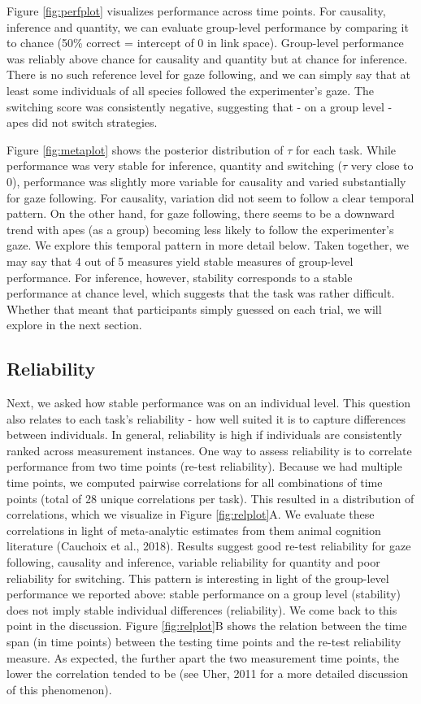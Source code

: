 \documentclass[10pt, letterpaper]{article}
\begin{document}
Figure \ref{fig:perfplot} visualizes performance across time points. For
causality, inference and quantity, we can evaluate group-level
performance by comparing it to chance (50\% correct = intercept of 0 in
link space). Group-level performance was reliably above chance for
causality and quantity but at chance for inference. There is no such
reference level for gaze following, and we can simply say that at least
some individuals of all species followed the experimenter's gaze. The
switching score was consistently negative, suggesting that - on a group
level - apes did not switch strategies.

Figure \ref{fig:metaplot} shows the posterior distribution of \(\tau\)
for each task. While performance was very stable for inference, quantity
and switching (\(\tau\) very close to 0), performance was slightly more
variable for causality and varied substantially for gaze following. For
causality, variation did not seem to follow a clear temporal pattern. On
the other hand, for gaze following, there seems to be a downward trend
with apes (as a group) becoming less likely to follow the experimenter's
gaze. We explore this temporal pattern in more detail below. Taken
together, we may say that 4 out of 5 measures yield stable measures of
group-level performance. For inference, however, stability corresponds
to a stable performance at chance level, which suggests that the task
was rather difficult. Whether that meant that participants simply
guessed on each trial, we will explore in the next section.

\hypertarget{reliability}{%
\subsection{Reliability}\label{reliability}}

Next, we asked how stable performance was on an individual level. This
question also relates to each task's reliability - how well suited it is
to capture differences between individuals. In general, reliability is
high if individuals are consistently ranked across measurement
instances. One way to assess reliability is to correlate performance
from two time points (re-test reliability). Because we had multiple time
points, we computed pairwise correlations for all combinations of time
points (total of 28 unique correlations per task). This resulted in a
distribution of correlations, which we visualize in Figure
\ref{fig:relplot}A. We evaluate these correlations in light of
meta-analytic estimates from them animal cognition literature (Cauchoix
et al., 2018). Results suggest good re-test reliability for gaze
following, causality and inference, variable reliability for quantity
and poor reliability for switching. This pattern is interesting in light
of the group-level performance we reported above: stable performance on
a group level (stability) does not imply stable individual differences
(reliability). We come back to this point in the discussion. Figure
\ref{fig:relplot}B shows the relation between the time span (in time
points) between the testing time points and the re-test reliability
measure. As expected, the further apart the two measurement time points,
the lower the correlation tended to be (see Uher, 2011 for a more
detailed discussion of this phenomenon).
\end{document}
